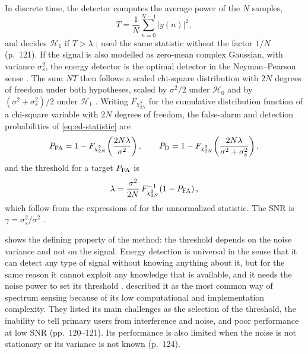 In discrete time, the detector computes the average power of the $N$ samples,
\begin{equation}
  T = \frac{1}{N} \sum_{n=0}^{N-1} \lvert y(n) \rvert^2 ,
  \label{eq:ed-statistic}
\end{equation}
and decides $\mathcal{H}_1$ if $T > \lambda$ \parencite[p.~322]{axell2010}; \textcite{yucek2009} used the same statistic without the factor $1/N$ (p.~121). If the signal is also modelled as zero-mean complex Gaussian, with variance $\sigma_s^2$, the energy detector is the optimal detector in the Neyman--Pearson sense \parencite[p.~322]{axell2010}. The sum $NT$ then follows a scaled chi-square distribution with $2N$ degrees of freedom under both hypotheses, scaled by $\sigma^2/2$ under $\mathcal{H}_0$ and by $(\sigma^2 + \sigma_s^2)/2$ under $\mathcal{H}_1$ \parencite[p.~121]{yucek2009}. Writing $F_{\chi^2_{2N}}$ for the cumulative distribution function of a chi-square variable with $2N$ degrees of freedom, the false-alarm and detection probabilities of \cref{eq:ed-statistic} are
\begin{equation}
  P_{\mathrm{FA}} = 1 - F_{\chi^2_{2N}}\!\left( \frac{2N\lambda}{\sigma^2} \right), \qquad
  P_{\mathrm{D}} = 1 - F_{\chi^2_{2N}}\!\left( \frac{2N\lambda}{\sigma^2 + \sigma_s^2} \right),
  \label{eq:ed-pfa-pd}
\end{equation}
and the threshold for a target $P_{\mathrm{FA}}$ is
\begin{equation}
  \lambda = \frac{\sigma^2}{2N}\, F^{-1}_{\chi^2_{2N}}\!\left(1 - P_{\mathrm{FA}}\right),
  \label{eq:ed-threshold}
\end{equation}
which follow from the expressions of \textcite[p.~323]{axell2010} for the unnormalized statistic. The SNR is $\gamma = \sigma_s^2/\sigma^2$ \parencite[p.~121]{yucek2009}.

 shows the defining property of the method: the threshold depends on the noise variance and not on the signal. Energy detection is universal in the sense that it can detect any type of signal without knowing anything about it, but for the same reason it cannot exploit any knowledge that is available, and it needs the noise power to set its threshold \parencite[p.~323]{axell2010}. \Textcite{yucek2009} described it as the most common way of spectrum sensing because of its low computational and implementation complexity. They listed its main challenges as the selection of the threshold, the inability to tell primary users from interference and noise, and poor performance at low SNR (pp.~120--121). Its performance is also limited when the noise is not stationary or its variance is not known (p.~124).

